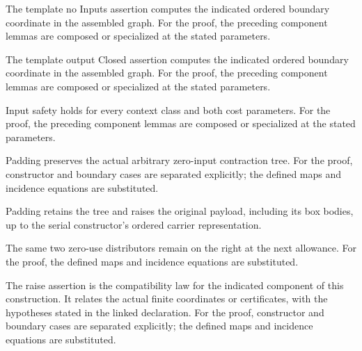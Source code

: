 The template no Inputs assertion computes the indicated ordered boundary coordinate in the assembled graph.
For the proof, the preceding component lemmas are composed or specialized at the stated parameters.
\par{}

The template output Closed assertion computes the indicated ordered boundary coordinate in the assembled graph.
For the proof, the preceding component lemmas are composed or specialized at the stated parameters.
\par{}

Input safety holds for every context class and both cost parameters.
For the proof, the preceding component lemmas are composed or specialized at the stated parameters.
\par{}

Padding preserves the actual arbitrary zero-input contraction tree.
For the proof, constructor and boundary cases are separated explicitly; the defined maps and incidence equations are substituted.
\par{}

Padding retains the tree and raises the original payload, including its box bodies, up to the serial constructor's ordered carrier representation.
\par{}

The same two zero-use distributors remain on the right at the next allowance.
For the proof, the defined maps and incidence equations are substituted.
\par{}

The raise assertion is the compatibility law for the indicated component of this construction. It relates the actual finite coordinates or certificates, with the hypotheses stated in the linked declaration.
For the proof, constructor and boundary cases are separated explicitly; the defined maps and incidence equations are substituted.
\par{}

